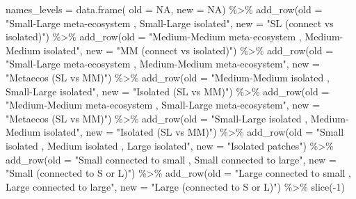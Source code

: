 \documentclass[
]{article}
\newenvironment{Shaded}{\begin{snugshade}}{\end{snugshade}}
\newcommand{\AttributeTok}[1]{\textcolor[rgb]{0.77,0.63,0.00}{#1}}
\newcommand{\ConstantTok}[1]{\textcolor[rgb]{0.00,0.00,0.00}{#1}}
\newcommand{\DecValTok}[1]{\textcolor[rgb]{0.00,0.00,0.81}{#1}}
\newcommand{\FunctionTok}[1]{\textcolor[rgb]{0.00,0.00,0.00}{#1}}
\newcommand{\NormalTok}[1]{#1}
\newcommand{\OtherTok}[1]{\textcolor[rgb]{0.56,0.35,0.01}{#1}}
\newcommand{\SpecialCharTok}[1]{\textcolor[rgb]{0.00,0.00,0.00}{#1}}
\newcommand{\StringTok}[1]{\textcolor[rgb]{0.31,0.60,0.02}{#1}}
\begin{document}
\begin{Shaded}
\begin{Highlighting}[]
\NormalTok{names\_levels }\OtherTok{=} \FunctionTok{data.frame}\NormalTok{(}
  \AttributeTok{old =} \ConstantTok{NA}\NormalTok{,}
  \AttributeTok{new =} \ConstantTok{NA}\NormalTok{) }\SpecialCharTok{\%\textgreater{}\%}
  \FunctionTok{add\_row}\NormalTok{(}\AttributeTok{old =} \StringTok{"Small{-}Large meta{-}ecosystem , Small{-}Large isolated"}\NormalTok{, }
          \AttributeTok{new =} \StringTok{"SL (connect vs isolated)"}\NormalTok{) }\SpecialCharTok{\%\textgreater{}\%}
  \FunctionTok{add\_row}\NormalTok{(}\AttributeTok{old =} \StringTok{"Medium{-}Medium meta{-}ecosystem , Medium{-}Medium isolated"}\NormalTok{, }
          \AttributeTok{new =} \StringTok{"MM (connect vs isolated)"}\NormalTok{) }\SpecialCharTok{\%\textgreater{}\%}
  \FunctionTok{add\_row}\NormalTok{(}\AttributeTok{old =} \StringTok{"Small{-}Large meta{-}ecosystem , Medium{-}Medium meta{-}ecosystem"}\NormalTok{, }
          \AttributeTok{new =} \StringTok{"Metaecos (SL vs MM)"}\NormalTok{) }\SpecialCharTok{\%\textgreater{}\%}
  \FunctionTok{add\_row}\NormalTok{(}\AttributeTok{old =} \StringTok{"Medium{-}Medium isolated , Small{-}Large isolated"}\NormalTok{, }
          \AttributeTok{new =} \StringTok{"Isolated (SL vs MM)"}\NormalTok{) }\SpecialCharTok{\%\textgreater{}\%}
  \FunctionTok{add\_row}\NormalTok{(}\AttributeTok{old =} \StringTok{"Medium{-}Medium meta{-}ecosystem , Small{-}Large meta{-}ecosystem"}\NormalTok{, }
          \AttributeTok{new =} \StringTok{"Metaecos (SL vs MM)"}\NormalTok{) }\SpecialCharTok{\%\textgreater{}\%}
  \FunctionTok{add\_row}\NormalTok{(}\AttributeTok{old =} \StringTok{"Small{-}Large isolated , Medium{-}Medium isolated"}\NormalTok{, }
          \AttributeTok{new =} \StringTok{"Isolated (SL vs MM)"}\NormalTok{) }\SpecialCharTok{\%\textgreater{}\%}
  \FunctionTok{add\_row}\NormalTok{(}\AttributeTok{old =} \StringTok{"Small isolated , Medium isolated , Large isolated"}\NormalTok{, }
          \AttributeTok{new =} \StringTok{"Isolated patches"}\NormalTok{) }\SpecialCharTok{\%\textgreater{}\%}
  \FunctionTok{add\_row}\NormalTok{(}\AttributeTok{old =} \StringTok{"Small connected to small , Small connected to large"}\NormalTok{, }
          \AttributeTok{new =} \StringTok{"Small (connected to S or L)"}\NormalTok{) }\SpecialCharTok{\%\textgreater{}\%}
  \FunctionTok{add\_row}\NormalTok{(}\AttributeTok{old =} \StringTok{"Large connected to small , Large connected to large"}\NormalTok{, }
          \AttributeTok{new =} \StringTok{"Large (connected to S or L)"}\NormalTok{) }\SpecialCharTok{\%\textgreater{}\%}
  \FunctionTok{slice}\NormalTok{(}\SpecialCharTok{{-}}\DecValTok{1}\NormalTok{)}


\end{Highlighting}
\end{Shaded}
\end{document}
